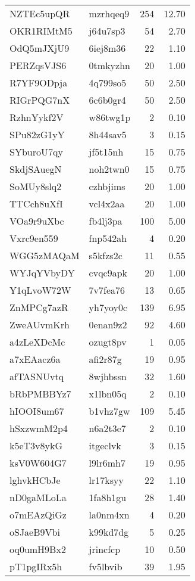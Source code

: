 \documentclass[]{elsarticle} %
\begin{document}
\begin{longtable}{llrr}
NZTEc5upQR & mzrhqeq9 & 254 & 12.70\\
\addlinespace
OKR1RIMtM5 & j64u7sp3 & 54 & 2.70\\
OdQ5mJXjU9 & 6iej8m36 & 22 & 1.10\\
PERZqsVJS6 & 0tmkyzhn & 20 & 1.00\\
R7YF9ODpja & 4q799so5 & 50 & 2.50\\
RIGrPQG7nX & 6c6b0gr4 & 50 & 2.50\\
\addlinespace
RzhnYykf2V & w86twg1p & 2 & 0.10\\
SPu82zG1yY & 8h44sav5 & 3 & 0.15\\
SYburoU7qy & jf5t15nh & 15 & 0.75\\
SkdjSAuegN & noh2twn0 & 15 & 0.75\\
SoMUy8slq2 & czhbjims & 20 & 1.00\\
\addlinespace
TTCch8uXfI & vcl4x2aa & 20 & 1.00\\
VOa9r9uXbc & fb4lj3pa & 100 & 5.00\\
Vxrc9en559 & fnp542ah & 4 & 0.20\\
WGG5zMAQaM & s5kfzs2c & 11 & 0.55\\
WYJqYVbyDY & cvqc9apk & 20 & 1.00\\
\addlinespace
Y1qLvoW72W & 7v7fea76 & 13 & 0.65\\
ZnMPCg7azR & yh7yoy0c & 139 & 6.95\\
ZweAUvmKrh & 0enan9z2 & 92 & 4.60\\
a4zLeXDcMc & ozugt8pv & 1 & 0.05\\
a7xEAacz6a & afi2r87g & 19 & 0.95\\
\addlinespace
afTASNUvtq & 8wjhbssn & 32 & 1.60\\
bRbPMBBYz7 & x1lbn05q & 2 & 0.10\\
hIOOI8um67 & b1vhz7gw & 109 & 5.45\\
hSxzwmM2p4 & n6a2t3e7 & 2 & 0.10\\
k5eT3v8ykG & itgeclvk & 3 & 0.15\\
\addlinespace
ksV0W604G7 & l9lr6mh7 & 19 & 0.95\\
lghvkHCbJe & lr17ksyy & 22 & 1.10\\
nD0gaMLoLa & 1fa8h1gu & 28 & 1.40\\
o7mEAzQiGz & la0nm4xn & 4 & 0.20\\
oSJaeB9Vbi & k99kd7dg & 5 & 0.25\\
\addlinespace
oq0umH9Bx2 & jrincfcp & 10 & 0.50\\
pT1pgIRx5h & fv5lbvib & 39 & 1.95\\

\end{longtable}
\end{document}
